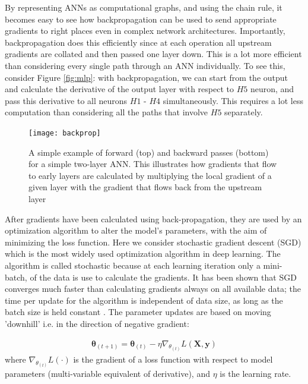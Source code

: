 \documentclass[12pt]{report}
\begin{document}
By representing ANNs as computational graphs, and using the chain rule, it becomes easy to see how backpropagation can be used to send appropriate gradients to right places even in complex network architectures. Importantly, backpropagation does this efficiently since at each operation all upstream gradients are collated and then passed one layer down. This is a lot more efficient than considering every single path through an ANN individually. To see this, consider Figure \ref{fig:mlp}: with backpropagation, we can start from the output and calculate the derivative of the output layer with respect to $H5$ neuron, and pass this derivative to all neurons $H1$ - $H4$ simultaneously. This requires a lot less computation than considering all the paths that involve $H5$ separately. 

\begin{figure}
  \centering
	\texttt{[image: backprop]}
	\caption{A simple example of forward (top) and backward passes (bottom) for a simple two-layer ANN. This illustrates how gradients that flow to early layers are calculated by multiplying the local gradient of a given layer with the gradient that flows back from the upstream layer}
	\label{fig:backprop}
\end{figure}

After gradients have been calculated using back-propagation, they are used by an optimization algorithm to alter the model's parameters, with the aim of minimizing the loss function. Here we consider stochastic gradient descent (SGD) \cite{Robbins1951} which is the most widely used optimization algorithm in deep learning. The algorithm is called stochastic because at each learning iteration only a mini-batch, of the data is use to calculate the gradients. It has been shown that SGD converges much faster than calculating gradients always on all available data; the time per update for the algorithm is independent of data size, as long as the batch size is held constant \cite{Goodfellow2016}. The parameter updates are based on moving 'downhill' i.e. in the direction of negative gradient:

\begin{align} \label{sgd_eq}
  \pmb{\theta}_{(t+1)}=\pmb{\theta}_{(t)} - \eta \nabla_{\theta_{(t)}}L(\mathbf{X}, \mathbf{y})
\end{align}
where $\nabla_{\theta_{(t)}}L(\cdot)$ is the gradient of a loss function with respect to model parameters (multi-variable equivalent of derivative), and $\eta$ is the learning rate.
\end{document}
